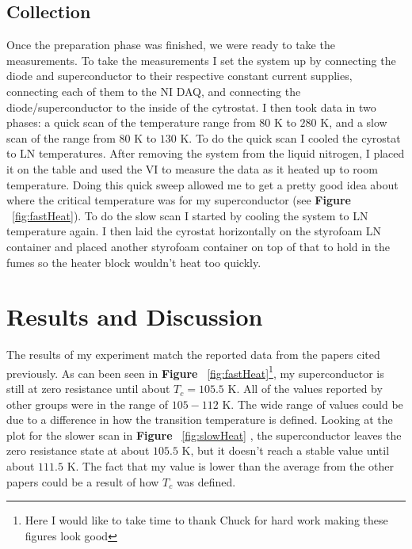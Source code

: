 \documentclass[paper=a4, fontsize=11pt]{scrartcl}
\numberwithin{equation}{section}
\numberwithin{figure}{section}
\numberwithin{table}{section}
\begin{document}
      \subsection{Collection}

            Once the preparation phase was finished, we were ready to take the measurements. To take the measurements I set the system up by connecting the diode and superconductor to their respective constant current supplies, connecting each of them to the NI DAQ, and connecting the diode/superconductor to the inside of the cytrostat. I then took data in two phases: a quick scan of the temperature range from $80$ K to $280$ K, and a slow scan of the range from $80$ K to $130$ K. To do the quick scan I cooled the cyrostat to LN temperatures. After removing the system from the liquid nitrogen, I placed it on the table and used the VI to measure the data as it heated up to room temperature. Doing this quick sweep allowed me to get a pretty good idea about where the critical temperature was for my superconductor (see \textbf{Figure} ~\ref{fig:fastHeat}). To do the slow scan I started by cooling the system to LN temperature again. I then laid the cyrostat horizontally on the styrofoam LN container and placed another styrofoam container on top of that to hold in the fumes so the heater block wouldn't heat too quickly.



  \section{Results and Discussion}

      The results of my experiment match the reported data from the papers cited previously. As can been seen in \textbf{Figure} ~\ref{fig:fastHeat}\footnote{Here I would like to take time to thank Chuck for hard work making these figures look good}, my superconductor is still at zero resistance until about $T_c = 105.5$ K.  All of the values reported by other groups were in the range of $105-112$ K. The wide range of values could be due to a difference in how the transition temperature is defined. Looking at the plot for the slower scan in \textbf{Figure} ~\ref{fig:slowHeat} , the superconductor leaves the zero resistance state at about $105.5$ K, but it doesn't reach a stable value until about $111.5$ K. The fact that my value is lower than the average from the other papers could be a result of how $T_c$ was defined.
\end{document}
